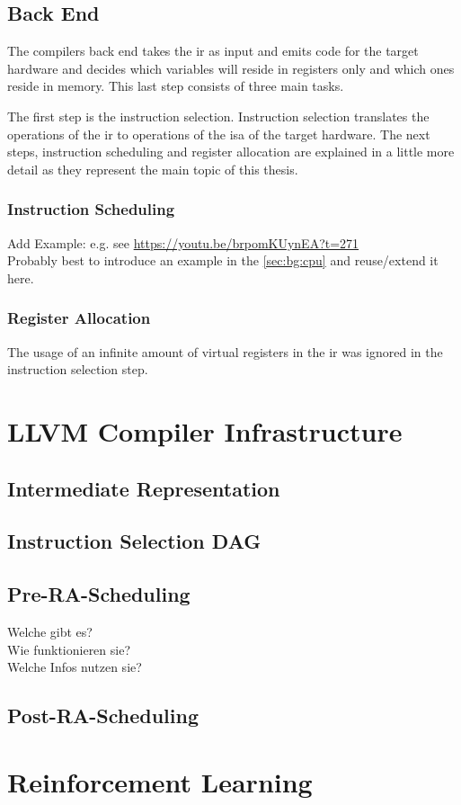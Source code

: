 \subsection{Back End}
\label{sec:bg:compilers:backend}
The compilers back end takes the \ac{ir} as input and emits code for the target hardware and decides which variables will reside in registers only and which ones reside in memory.
This last step consists of three main tasks.

The first step is the instruction selection.
Instruction selection translates the operations of the \ac{ir} to operations of the \ac{isa} of the target hardware.
The next steps, instruction scheduling and register allocation are explained in a little more detail as they represent the main topic of this thesis.

\subsubsection{Instruction Scheduling}
Add Example: e.g. see \url{https://youtu.be/brpomKUynEA?t=271} \\
Probably best to introduce an example in the \cref{sec:bg:cpu} and reuse/extend it here.

\subsubsection{Register Allocation}
The usage of an infinite amount of virtual registers in the \ac{ir} was ignored in the instruction selection step.

\section{LLVM Compiler Infrastructure}
\subsection{Intermediate Representation}
\subsection{Instruction Selection DAG}
\subsection{Pre-RA-Scheduling}
Welche gibt es?\\
Wie funktionieren sie?\\
Welche Infos nutzen sie?\\
\subsection{Post-RA-Scheduling}

\section{Reinforcement Learning}
